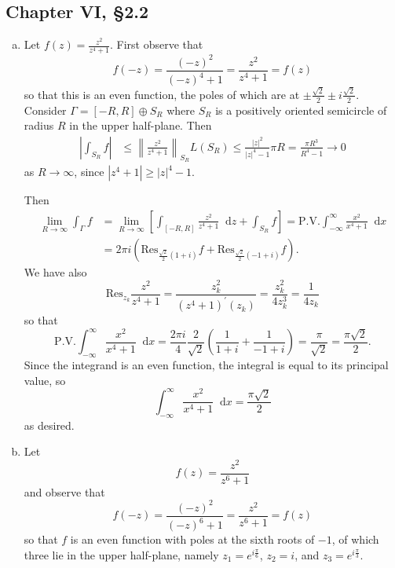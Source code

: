 \documentclass{article}
\newcommand\Res{\mathrm{Res}}
\newcommand\dif{\mathop{}\!\mathrm{d}}
\begin{document}
\subsection*{Chapter VI, \S 2.2}
\begin{enumerate}[(a)]
  \item{
    Let $f(z) = \frac{z^2}{z^4 + 1}$.
    First observe that
    $$
      f(-z)
    = \frac{(-z)^2}{(-z)^4 + 1}
    = \frac{z^2}{z^4 + 1}
    = f(z)
    $$
    so that this is an even function, the poles of which are
    at $\pm \frac{\sqrt{2}}{2} \pm i \frac{\sqrt{2}}{2}$. Consider
    $\Gamma = [-R, R] \oplus S_R$ where $S_R$ is a positively oriented
    semicircle of radius $R$ in the upper half-plane. Then
    \begin{align*}
          \left|
            \int_{S_R} f
          \right|
    &\leq \left\|
            \frac{z^2}{z^4 + 1}
          \right\|_{S_R}
          L(S_R)
     \leq \frac{|z|^2}{|z|^4 - 1} \pi R
     =    \frac{\pi R^3}{R^4 - 1}
     \to 0
    \end{align*}
    as $R \to \infty$, since $|z^4 + 1| \geq |z|^4 - 1$.

    Then
    \begin{align*}
       \lim_{R \to \infty}
       \int_\Gamma
         f
    &= \lim_{R \to \infty}
       \left[
         \int_{[-R, R]}
           \frac{z^2}{z^4 + 1}
           \dif z
       + \int_{S_R}
           f
       \right]
     = \mathrm{P.V.}
         \int_{-\infty}^\infty
           \frac{x^2}{x^4 + 1}
           \dif x \\
    &= 2 \pi i
       ( \Res_{\frac{\sqrt{2}}{2}(1 + i)} f
       + \Res_{\frac{\sqrt{2}}{2}(-1 + i)} f).
    \end{align*}
    We have also
    $$
      \Res_{z_k} \frac{z^2}{z^4 + 1}
    = \frac{z_k^2}
           {(z^4 + 1)^\prime(z_k)}
    = \frac{z_k^2}
           {4z_k^3}
    = \frac{1}{4 z_k}
    $$
    so that
    $$
      \mathrm{P.V.}
      \int_{-\infty}^\infty
        \frac{x^2}{x^4 + 1}
        \dif x
    = \frac{2 \pi i}{4}
      \frac{2}{\sqrt{2}}
      \left(
        \frac{1}
             {1 + i}
      + \frac{1}
             {-1 + i}
      \right)
    = \frac{\pi}{\sqrt{2}}
    = \frac{\pi \sqrt{2}}{2}.
    $$
    Since the integrand is an even function,
    the integral is equal to its principal value,
    so
    $$
      \int_{-\infty}^\infty
        \frac{x^2}
             {x^4 + 1} \dif x
    = \frac{\pi \sqrt{2}}{2}
    $$
    as desired.
  }
  \item{
    Let
    $$
    f(z) = \frac{z^2}{z^6 + 1}
    $$
    and observe that
    $$
      f(-z)
    = \frac{(-z)^2}{(-z)^6 + 1}
    = \frac{z^2}{z^6 + 1}
    = f(z)
    $$
    so that $f$ is an even function with poles at the
    sixth roots of $-1$, of which three lie in the
    upper half-plane, namely
    $z_1 = e^{i\frac{\pi}{6}}$, $z_2 = i$, and $z_3 = e^{i\frac{\pi}{3}}$.

}
\end{enumerate}
\end{document}
